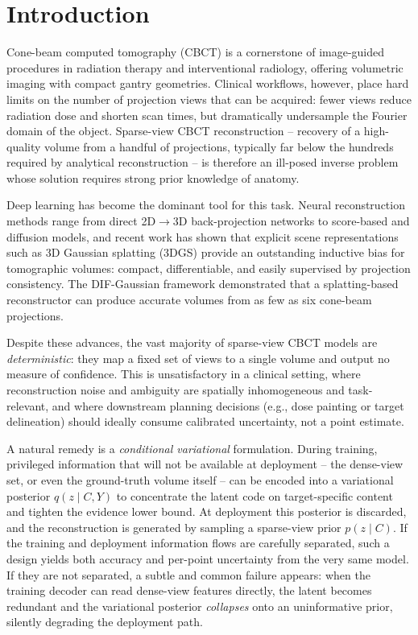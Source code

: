
\section{Introduction}
\label{sec:intro}

Cone-beam computed tomography (CBCT) is a cornerstone of image-guided
procedures in radiation therapy and interventional radiology, offering
volumetric imaging with compact gantry geometries. Clinical workflows,
however, place hard limits on the number of projection views that can be
acquired: fewer views reduce radiation dose and shorten scan times, but
dramatically undersample the Fourier domain of the object. Sparse-view CBCT
reconstruction -- recovery of a high-quality volume from a handful of
projections, typically far below the hundreds required by analytical
reconstruction -- is therefore an ill-posed inverse problem whose solution
requires strong prior knowledge of anatomy.

Deep learning has become the dominant tool for this task. Neural
reconstruction methods range from direct 2D$\to$3D back-projection networks
to score-based and diffusion models, and recent work has shown that
explicit scene representations such as 3D Gaussian splatting (3DGS)
\cite{kerbl2023gaussiansplats} provide an outstanding inductive bias for
tomographic volumes: compact, differentiable, and easily supervised by
projection consistency. The DIF-Gaussian framework \cite{lin2024difgaussian}
demonstrated that a splatting-based reconstructor can produce accurate
volumes from as few as six cone-beam projections.

Despite these advances, the vast majority of sparse-view CBCT models are
\emph{deterministic}: they map a fixed set of views to a single volume and
output no measure of confidence. This is unsatisfactory in a clinical
setting, where reconstruction noise and ambiguity are spatially
inhomogeneous and task-relevant, and where downstream planning decisions
(e.g., dose painting or target delineation) should ideally consume
calibrated uncertainty, not a point estimate.

A natural remedy is a \emph{conditional variational} formulation. During
training, privileged information that will not be available at deployment --
the dense-view set, or even the ground-truth volume itself -- can be
encoded into a variational posterior $q(z\mid C,Y)$ to concentrate the
latent code on target-specific content and tighten the evidence lower
bound. At deployment this posterior is discarded, and the reconstruction is
generated by sampling a sparse-view prior $p(z\mid C)$. If the training and
deployment information flows are carefully separated, such a design yields
both accuracy and per-point uncertainty from the very same model. If they
are not separated, a subtle and common failure appears: when the training
decoder can read dense-view features directly, the latent becomes redundant
and the variational posterior \emph{collapses} onto an uninformative prior,
silently degrading the deployment path.

